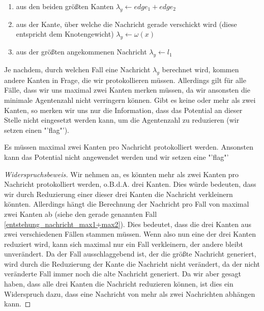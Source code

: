 \begin{enumerate}[label=\alph*)]
	
	\item aus den beiden größten Kanten $\lambda_{y} \gets edge_{1} + edge_{2}$ \label{entstehung_nachricht_max1+max2}
	
	\item aus der Kante, über welche die Nachricht gerade verschickt wird (diese entspricht dem Knotengewicht) $\lambda_{y} \gets \omega(x)$
	
	\item aus der größten angekommenen Nachricht $\lambda_{y} \gets l_{1}$

\end{enumerate}

Je nachdem, durch welchen Fall eine Nachricht $\lambda_{y}$ berechnet wird, kommen andere Kanten in Frage, die wir protokollieren müssen.
Allerdings gilt für alle Fälle, dass wir uns maximal zwei Kanten merken müssen, da wir ansonsten die minimale Agentenzahl nicht verringern können. Gibt es keine oder mehr als zwei Kanten, so merken wir uns nur die Information, dass das Potential an dieser Stelle nicht eingesetzt werden kann, um die Agentenzahl zu reduzieren (wir setzen einen "'flag"').

\begin{theorem}\label{theorem_max2kanten}
	Es müssen maximal zwei Kanten pro Nachricht protokolliert werden. Ansonsten kann das Potential nicht angewendet werden und wir setzen eine "'flag"'
\end{theorem}

\begin{proof}[Widerspruchsbeweis]
	Wir nehmen an, es könnten mehr als zwei Kanten pro Nachricht protokolliert werden, o.B.d.A. drei Kanten. Dies würde bedeuten, dass wir durch Reduzierung einer dieser drei Kanten die Nachricht verkleinern könnten. Allerdings hängt die Berechnung der Nachricht pro Fall von maximal zwei Kanten ab (siehe den gerade genannten Fall \ref{entstehung_nachricht_max1+max2}). Dies bedeutet, dass die drei Kanten aus zwei verschiedenen Fällen stammen müssen. Wenn also nun eine der drei Kanten reduziert wird, kann sich maximal nur ein Fall verkleinern, der andere bleibt unverändert. Da der Fall ausschlaggebend ist, der die größte Nachricht generiert, wird durch die Reduzierung der Kante die Nachricht nicht verändert, da der nicht veränderte Fall immer noch die alte Nachricht generiert. Da wir aber gesagt haben, dass alle drei Kanten die Nachricht reduzieren können, ist dies ein Widerspruch dazu, dass eine Nachricht von mehr als zwei Nachrichten abhängen kann.
\end{proof}

